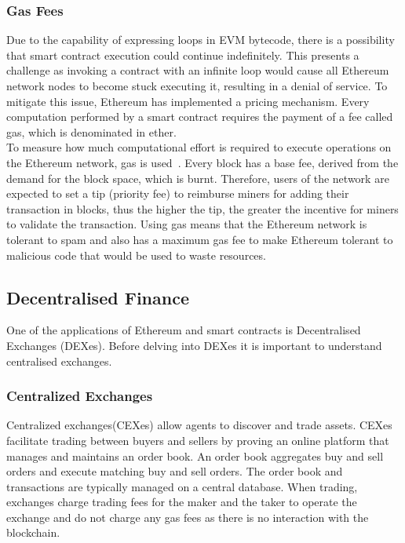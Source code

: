 \subsubsection{Gas Fees}
Due to the capability of expressing loops in EVM bytecode, there is a possibility that smart contract execution could continue indefinitely. This presents a challenge as invoking a contract with an infinite loop would cause all Ethereum network nodes to become stuck executing it, resulting in a denial of service. To mitigate this issue, Ethereum has implemented a pricing mechanism. Every computation performed by a smart contract requires the payment of a fee called gas, which is denominated in ether.
\\[3mm]
To measure how much computational effort is required to execute operations on the Ethereum network, gas is used~\cite{noauthor_gas_nodate}. Every block has a base fee, derived from the demand for the block space, which is burnt. Therefore, users of the network are expected to set a tip (priority fee) to reimburse miners for adding their transaction in blocks, thus the higher the tip, the greater the incentive for miners to validate the transaction. Using gas means that the Ethereum network is tolerant to spam and also has a maximum gas fee to make Ethereum tolerant to malicious code that would be used to waste resources.

\subsection{Decentralised Finance}
One of the applications of Ethereum and smart contracts is Decentralised Exchanges (DEXes). Before delving into DEXes it is important to understand centralised exchanges.

\subsubsection{Centralized Exchanges}
Centralized exchanges(CEXes) allow agents to discover and trade assets. CEXes facilitate trading between buyers and sellers by proving an online platform that manages and maintains an order book. An order book aggregates buy and sell orders and execute matching buy and sell orders. The order book and transactions are typically managed on a central database. When trading, exchanges charge trading fees for the maker and the taker to operate the exchange and do not charge any gas fees as there is no interaction with the blockchain. 

